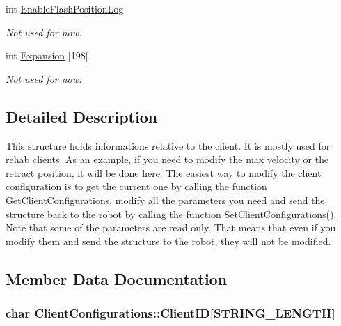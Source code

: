 \begin{DoxyCompactItemize}
int \hyperlink{struct_client_configurations_ae0c7b4d0a3f91271e8138985807be8c6}{Enable\+Flash\+Position\+Log}
\begin{DoxyCompactList}\small\item\em Not used for now. \end{DoxyCompactList}\item 
int \hyperlink{struct_client_configurations_a2d47352837bfafcb6f4e6bddcf3e0278}{Expansion} \mbox{[}198\mbox{]}
\begin{DoxyCompactList}\small\item\em Not used for now. \end{DoxyCompactList}\end{DoxyCompactItemize}


\subsection{Detailed Description}
This structure holds informations relative to the client. It is mostly used for rehab clients. As an example, if you need to modify the max velocity or the retract position, it will be done here. The easiest way to modify the client configuration is to get the current one by calling the function Get\+Client\+Configurations, modify all the parameters you need and send the structure back to the robot by calling the function \hyperlink{_kinova_8_a_p_i_8_usb_command_layer_ubuntu_8h_aaaf906c81f0dbdc53101d61c7838eae8}{Set\+Client\+Configurations()}. Note that some of the parameters are read only. That means that even if you modify them and send the structure to the robot, they will not be modified. 

\subsection{Member Data Documentation}
\subsubsection[{\texorpdfstring{Client\+ID}{ClientID}}]{\setlength{\rightskip}{0pt plus 5cm}char Client\+Configurations\+::\+Client\+ID\mbox{[}{\bf S\+T\+R\+I\+N\+G\+\_\+\+L\+E\+N\+G\+TH}\mbox{]}}\hypertarget{struct_client_configurations_a2adccda7d27c7731ab0fe1160005e6ac}{}\label{struct_client_configurations_a2adccda7d27c7731ab0fe1160005e6ac}


